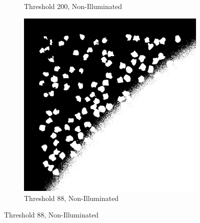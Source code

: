 \documentclass[%
	a4paper, %
	12pt, %
	english, %
	bibtotoc %
]{scrartcl}
\begin{document}
\begin{figure}[H]
\begin{subfigure}{0.3\linewidth}
        \caption{Threshold 200, Non-Illuminated}
        \label{fig:segmentation_200_threshold_non_illuminated}
    \end{subfigure}
    \begin{subfigure}{0.3\linewidth}
        \includegraphics[width=\linewidth]{latex-template-ss24/images/segmentation_88_threshold_non_illuminated.png}
        \caption{Threshold 88, Non-Illuminated}
        \label{fig:segmentation_88_threshold_non_illuminated}
    \end{subfigure}
    

\end{figure}
\end{document}
